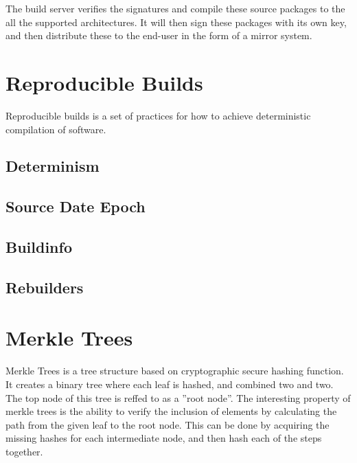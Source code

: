 \documentclass[../Main/thesis.tex]{subfiles}
\begin{document}
    The build server verifies the signatures and compile these source packages
    to the all the supported architectures. It will then sign these packages
    with its own key, and then distribute these to the end-user in the form of a
    mirror system.


\section{Reproducible Builds}\label{sec:reproducible_builds}

    Reproducible builds is a set of practices for how to achieve deterministic
    compilation of software. 



    \subsection*{Determinism}

    \subsection*{Source Date Epoch}
    \subsection*{Buildinfo}

    \subsection*{Rebuilders}%

\section{Merkle Trees}
Merkle Trees is a tree structure based on cryptographic secure hashing
function.\cite{ralph-c.-merkle-1998} It creates a binary tree where each leaf
is hashed, and combined two and two. The top node of this tree is reffed to as a
''root node''. The interesting property of merkle trees is the ability to verify
the inclusion of elements by calculating the path from the given leaf to the
root node. This can be done by acquiring the missing hashes for each
intermediate node, and then hash each of the steps together.
\end{document}
